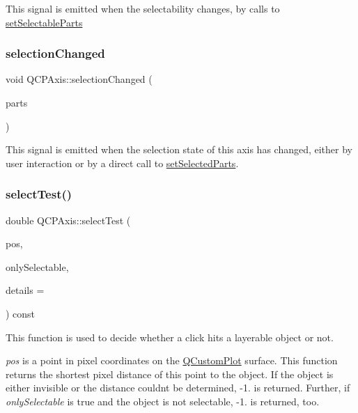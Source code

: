 This signal is emitted when the selectability changes, by calls to \hyperlink{class_q_c_p_axis_a513f9b9e326c505d9bec54880031b085}{set\+Selectable\+Parts} \mbox{\label{class_q_c_p_axis_a62b598abeee7174a05f9d542cc85b1f5}} 
\subsubsection{\texorpdfstring{selection\+Changed}{selectionChanged}}
{\footnotesize\ttfamily void Q\+C\+P\+Axis\+::selection\+Changed (\begin{DoxyParamCaption}\item[{const Q\+C\+P\+Axis\+::\+Selectable\+Parts \&}]{parts }\end{DoxyParamCaption})\hspace{0.3cm}{\ttfamily [signal]}}

This signal is emitted when the selection state of this axis has changed, either by user interaction or by a direct call to \hyperlink{class_q_c_p_axis_ab9d7a69277dcbed9119b3c1f25ca19c3}{set\+Selected\+Parts}. \mbox{\label{class_q_c_p_axis_a63b7103c57fe9acfbce164334ea837f8}} 
\subsubsection{\texorpdfstring{select\+Test()}{selectTest()}}
{\footnotesize\ttfamily double Q\+C\+P\+Axis\+::select\+Test (\begin{DoxyParamCaption}\item[{const Q\+PointF \&}]{pos,  }\item[{bool}]{only\+Selectable,  }\item[{Q\+Variant $\ast$}]{details = {} }\end{DoxyParamCaption}) const\hspace{0.3cm}{\ttfamily [virtual]}}

This function is used to decide whether a click hits a layerable object or not.

{\itshape pos} is a point in pixel coordinates on the \hyperlink{class_q_custom_plot}{Q\+Custom\+Plot} surface. This function returns the shortest pixel distance of this point to the object. If the object is either invisible or the distance couldn\textquotesingle{}t be determined, -\/1. is returned. Further, if {\itshape only\+Selectable} is true and the object is not selectable, -\/1. is returned, too.

